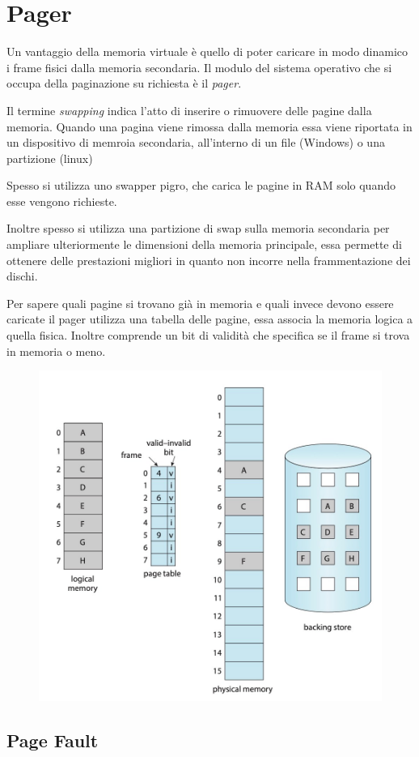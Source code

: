 \section{Pager}
Un vantaggio della memoria virtuale è quello di poter caricare in modo dinamico i frame fisici dalla memoria secondaria. Il modulo del sistema operativo che si occupa della paginazione su richiesta è il \textit{pager}.

\spacer
Il termine \textit{swapping} indica l'atto di inserire o rimuovere delle pagine dalla memoria.
Quando una pagina viene rimossa dalla memoria essa viene riportata in un dispositivo di memroia secondaria, all'interno di un file (Windows) o una partizione (linux)

\spacer
Spesso si utilizza uno swapper pigro, che carica le pagine in RAM solo quando esse vengono richieste.

\begin{note}
    Inoltre spesso si utilizza una partizione di swap sulla memoria secondaria per ampliare ulteriormente le dimensioni della memoria principale, essa permette di ottenere delle prestazioni migliori in quanto non incorre nella frammentazione dei dischi.
\end{note}

Per sapere quali pagine si trovano già in memoria e quali invece devono essere caricate il pager utilizza una tabella delle pagine, essa associa la memoria logica a quella fisica. Inoltre comprende un bit di validità che specifica se il frame si trova in memoria o meno.

\begin{figure}[H]
    \centering
    \includegraphics[width=0.45\linewidth]{assets/tabella-pagine.jpg}
\end{figure}

\subsection{Page Fault}

